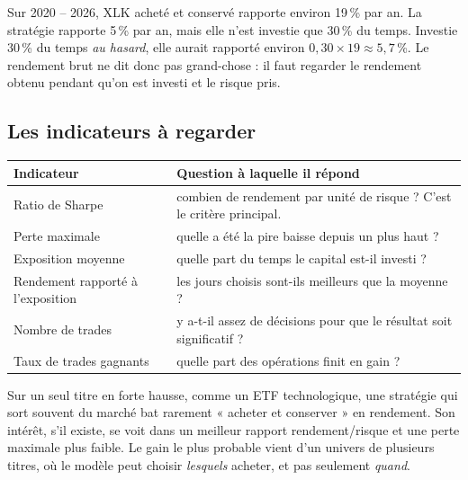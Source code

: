 \documentclass[11pt,a4paper]{article}
\begin{document}
\begin{exemple}
Sur 2020 -- 2026, XLK acheté et conservé rapporte environ 19\,\% par an. La stratégie
rapporte 5\,\% par an, mais elle n'est investie que 30\,\% du temps. Investie 30\,\% du temps
\emph{au hasard}, elle aurait rapporté environ $0{,}30 \times 19 \approx 5{,}7$\,\%. Le
rendement brut ne dit donc pas grand-chose : il faut regarder le rendement obtenu pendant
qu'on est investi et le risque pris.
\end{exemple}

\subsection{Les indicateurs à regarder}
\begin{center}
\small
\begin{tabularx}{\linewidth}{@{}l >{\raggedright\arraybackslash}X@{}}
\toprule
\textbf{Indicateur} & \textbf{Question à laquelle il répond} \\
\midrule
Ratio de Sharpe & combien de rendement par unité de risque ? C'est le critère principal. \\
Perte maximale & quelle a été la pire baisse depuis un plus haut ? \\
Exposition moyenne & quelle part du temps le capital est-il investi ? \\
Rendement rapporté à l'exposition & les jours choisis sont-ils meilleurs que la moyenne ? \\
Nombre de trades & y a-t-il assez de décisions pour que le résultat soit significatif ? \\
Taux de trades gagnants & quelle part des opérations finit en gain ? \\
\bottomrule
\end{tabularx}
\end{center}

Sur un seul titre en forte hausse, comme un ETF technologique, une stratégie qui sort
souvent du marché bat rarement « acheter et conserver » en rendement. Son intérêt, s'il
existe, se voit dans un meilleur rapport rendement/risque et une perte maximale plus
faible. Le gain le plus probable vient d'un univers de plusieurs titres, où le modèle peut
choisir \emph{lesquels} acheter, et pas seulement \emph{quand}.

\end{document}
